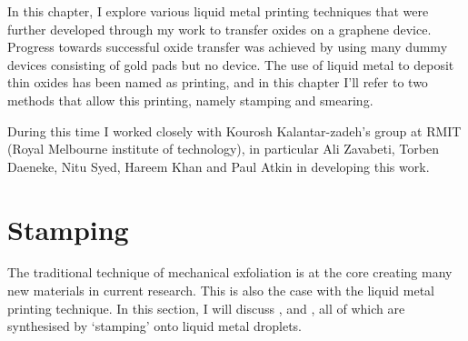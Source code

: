 \documentclass[../Matt_Gebert_Honours_Thesis.tex]{subfiles}
\begin{document}

	In this chapter, I explore various liquid metal printing techniques\cite{zavabeti_liquid_2017} that were further developed through my work to transfer oxides on a graphene device. Progress towards successful oxide transfer was achieved by using many dummy devices consisting of gold pads but no device. The use of liquid metal to deposit thin oxides has been named as printing, and in this chapter I'll refer to two methods that allow this printing, namely stamping and smearing.
	
	During this time I worked closely with Kourosh Kalantar-zadeh's group at RMIT (Royal Melbourne institute of technology), in particular Ali Zavabeti, Torben Daeneke, Nitu Syed, Hareem Khan and Paul Atkin in developing this work.

	\section{Stamping}\label{sec:printing}
		The traditional technique of mechanical exfoliation is at the core creating many new materials in current research. This is also the case with the liquid metal printing technique. In this section, I will discuss \aluminimumoxide{}, \tinoxide{} and \bismuthoxide{}, all of which are synthesised by `stamping' onto liquid metal droplets.
		
\end{document}
